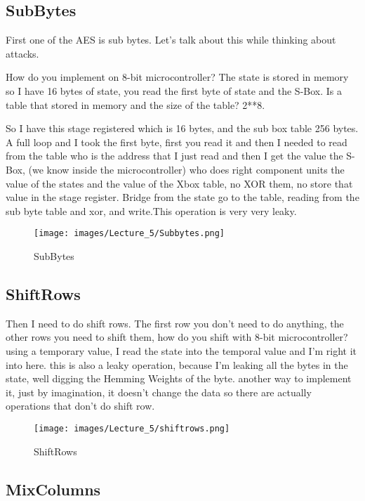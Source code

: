 \subsection{SubBytes}
First one of the AES is sub bytes. Let's talk about this while thinking about
attacks. 

How do you implement on 8-bit microcontroller? The state is stored in memory so
I have 16 bytes of state, you read the first byte of state and the S-Box. Is a
table that stored in memory and the size of the table? 2**8. 

So I have this stage registered which is 16 bytes, and the sub box table 256
bytes. A full loop and I took the first byte, first you read it and then I
needed to read from the table who is the address that I just read and then I get
the value the S-Box, (we know inside the microcontroller) who does right
component units the value of the states and the value of the Xbox table, no XOR
them, no store that value in the stage register. Bridge from the state go to the
table, reading from the sub byte table and xor, and write.This operation is very
very leaky.

\begin{figure}[htp]
\centering
\texttt{[image: images/Lecture\_5/Subbytes.png]}
\caption{SubBytes}\label{fig:SubBytes}
\end{figure}

\subsection{ShiftRows}

Then I need to do shift rows. The first row you don't need to do anything, the
other rows you need to shift them, how do you shift with 8-bit microcontroller?
using a temporary value, I read the state into the temporal value and I'm right
it into here. this is also a leaky operation, because I'm leaking all the bytes
in the state, well digging the Hemming Weights of the byte. another way to
implement it, just by imagination, it doesn't change the data so there are
actually operations that don't do shift row.

\begin{figure}[htp]
\centering
\texttt{[image: images/Lecture\_5/shiftrows.png]}
\caption{ShiftRows}\label{fig:ShiftRows}
\end{figure}

\subsection{MixColumns}


